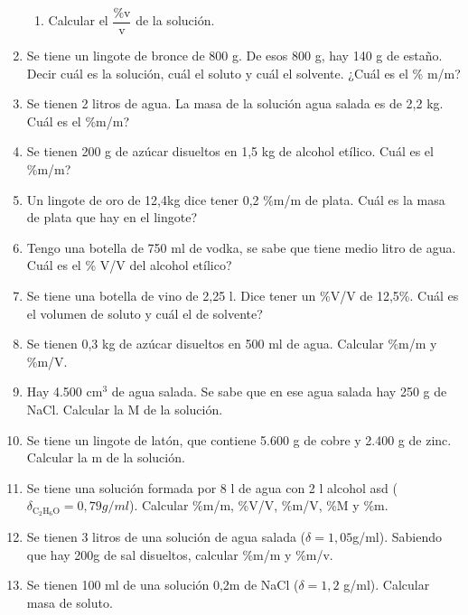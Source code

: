 \begin{enumerate}
\begin{enumerate}
    \item Calcular el $\dfrac{\%\text{v}}{\text{v}}$ de la solución.
\end{enumerate}


\item Se tiene un lingote de bronce de 800 g. De esos 800 g, hay 140 g de estaño. Decir cuál es la solución, cuál el soluto y cuál el solvente. ¿Cuál es el \% m/m? %

\item Se tienen 2 litros de agua. La masa de la solución agua salada es de 2,2 kg. Cuál es el \%m/m? %

\item Se tienen 200 g de azúcar disueltos en 1,5 kg de alcohol etílico. Cuál es el \%m/m? %

\item Un lingote de oro de 12,4kg dice tener 0,2 \%m/m de plata. Cuál es la masa de plata que hay en el lingote?

\item Tengo una botella de 750 ml de vodka, se sabe que tiene medio litro de agua. Cuál es el \% V/V del alcohol etílico?

\item Se tiene una botella de vino de 2,25 l. Dice tener un \%V/V de 12,5\%. Cuál es el volumen de soluto y cuál el de solvente?

\item Se tienen 0,3 kg de azúcar disueltos en 500 ml de agua. Calcular \%m/m y \%m/V.

\item Hay 4.500 cm$^3$ de agua salada. Se sabe que en ese agua salada hay 250 g de NaCl. Calcular la M de la solución. %

\item Se tiene un lingote de latón, que contiene 5.600 g de cobre y 2.400 g de zinc. Calcular la m de la solución. %

\item Se tiene una solución formada por 8 l de agua con 2 l  alcohol asd ($\delta_{\text{C}_2\text{H}_6\text{O}}=0,79 g/ml$). Calcular \%m/m, \linebreak
\%V/V, \%m/V, \%M y \%m.

\item Se tienen 3 litros de una solución de agua salada ($\delta = 1,05$g/ml). Sabiendo que hay 200g de sal disueltos, calcular \%m/m y \%m/v. %

\item Se tienen 100 ml de una solución 0,2m de NaCl ($\delta = 1,2$ g/ml). Calcular masa de soluto. %
\end{enumerate}

